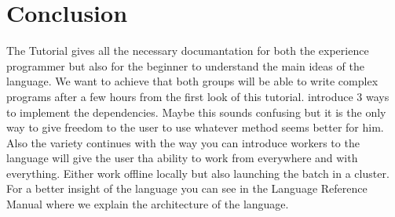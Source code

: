 \section{Conclusion}
\label{sect:conclusion}
The \lang{} Tutorial gives all the necessary documantation for both the experience programmer
but also for the beginner to understand the main ideas of the language. We want to achieve that
both groups will be able to write complex \lang{} programs after a few hours from the first look
of this tutorial. \lang{} introduce 3 ways to implement the dependencies. Maybe this sounds
confusing but it is the only way to give freedom to the user to use whatever method seems
better for him. Also the variety continues with the way you can introduce workers to the language
will give the user tha ability to work from everywhere and with everything. Either work offline locally
but also launching the batch in a cluster. For a better insight of the \lang{} language you can 
see in the Language Reference Manual where we explain the architecture of the language.

